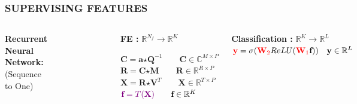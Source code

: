\documentclass{beamer}
\begin{document}
\begin{frame}
\frametitle{SUPERVISING FEATURES}
\begin{columns}[c]
\textbf{Recurrent Neural Network:}\\
(Sequence to One)
\begin{figure}
\includegraphics[width=\textwidth]{rnn_1}
\end{figure}
\begin{block}{\textbf{FE :} $\mathbb{R}^{N_{f}} \rightarrow \mathbb{R}^{K}$}

$\textbf{C} = \textbf{a} \bm{\star} \textbf{Q}^{-1} \qquad \textbf{C} \in \mathbb{C}^{M \times P}$\\
$\textbf{R} = \textbf{C} \bm{\star} \textbf{M} \qquad \textbf{R} \in \mathbb{R}^{R \times P}$\\
$\textbf{X} = \textbf{R} \bm{\star} \textbf{V}^{T} \qquad \textbf{X} \in \mathbb{R}^{T \times P}$\\
${\color{violet}\textbf{f} = T(\textbf{X})} \qquad \textbf{f} \in \mathbb{R}^{K}$\\
\end{block}
\begin{block}{\textbf{Classification :} $\mathbb{R}^{K} \rightarrow \mathbb{R}^{L}$}
${\color{red}\textbf{y}} = \sigma({\color{red}\textbf{W}_{2}}ReLU({\color{red}\textbf{W}_{1}}\textbf{f})) \quad \textbf{y} \in \mathbb{R}^{L}$
\end{block}
\end{columns}
\end{frame}
\end{document}
